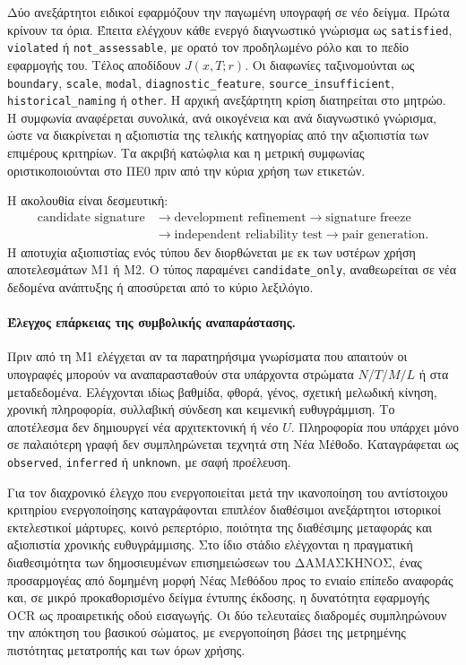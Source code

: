 \documentclass[11pt,a4paper]{article}
\begin{document}
Δύο ανεξάρτητοι ειδικοί εφαρμόζουν την παγωμένη υπογραφή σε νέο δείγμα. Πρώτα κρίνουν τα όρια. Έπειτα ελέγχουν κάθε ενεργό διαγνωστικό γνώρισμα ως \texttt{satisfied}, \texttt{violated} ή \texttt{not\_assessable}, με ορατό τον προδηλωμένο ρόλο και το πεδίο εφαρμογής του. Τέλος αποδίδουν $J(x,T;r)$. Οι διαφωνίες ταξινομούνται ως \texttt{boundary}, \texttt{scale}, \texttt{modal}, \texttt{diagnostic\_feature}, \texttt{source\_insufficient}, \texttt{historical\_naming} ή \texttt{other}. Η αρχική ανεξάρτητη κρίση διατηρείται στο μητρώο. Η συμφωνία αναφέρεται συνολικά, ανά οικογένεια και ανά διαγνωστικό γνώρισμα, ώστε να διακρίνεται η αξιοπιστία της τελικής κατηγορίας από την αξιοπιστία των επιμέρους κριτηρίων. Τα ακριβή κατώφλια και η μετρική συμφωνίας οριστικοποιούνται στο ΠΕ0 πριν από την κύρια χρήση των ετικετών.

Η ακολουθία είναι δεσμευτική:
\[
\begin{aligned}
\text{candidate signature} &\rightarrow \text{development refinement}
\rightarrow \text{signature freeze}\\
&\rightarrow \text{independent reliability test}
\rightarrow \text{pair generation}.
\end{aligned}
\]
Η αποτυχία αξιοπιστίας ενός τύπου δεν διορθώνεται με εκ των υστέρων χρήση αποτελεσμάτων M1 ή M2. Ο τύπος παραμένει \texttt{candidate\_only}, αναθεωρείται σε νέα δεδομένα ανάπτυξης ή αποσύρεται από το κύριο λεξιλόγιο.

\paragraph{Έλεγχος επάρκειας της συμβολικής αναπαράστασης.}
Πριν από τη M1 ελέγχεται αν τα παρατηρήσιμα γνωρίσματα που απαιτούν οι υπογραφές μπορούν να αναπαρασταθούν στα υπάρχοντα στρώματα $N/T/M/L$ ή στα μεταδεδομένα. Ελέγχονται ιδίως βαθμίδα, φθορά, γένος, σχετική μελωδική κίνηση, χρονική πληροφορία, συλλαβική σύνδεση και κειμενική ευθυγράμμιση. Το αποτέλεσμα δεν δημιουργεί νέα αρχιτεκτονική ή νέο $U$. Πληροφορία που υπάρχει μόνο σε παλαιότερη γραφή δεν συμπληρώνεται τεχνητά στη Νέα Μέθοδο. Καταγράφεται ως \texttt{observed}, \texttt{inferred} ή \texttt{unknown}, με σαφή προέλευση.

Για τον διαχρονικό έλεγχο που ενεργοποιείται μετά την ικανοποίηση του αντίστοιχου κριτηρίου ενεργοποίησης καταγράφονται επιπλέον διαθέσιμοι ανεξάρτητοι ιστορικοί εκτελεστικοί μάρτυρες, κοινό ρεπερτόριο, ποιότητα της διαθέσιμης μεταφοράς και αξιοπιστία χρονικής ευθυγράμμισης. Στο ίδιο στάδιο ελέγχονται η πραγματική διαθεσιμότητα των δημοσιευμένων επισημειώσεων του ΔΑΜΑΣΚΗΝΟΣ, ένας προσαρμογέας από δομημένη μορφή Νέας Μεθόδου προς το ενιαίο επίπεδο αναφοράς και, σε μικρό προκαθορισμένο δείγμα έντυπης έκδοσης, η δυνατότητα εφαρμογής OCR ως προαιρετικής οδού εισαγωγής. Οι δύο τελευταίες διαδρομές συμπληρώνουν την απόκτηση του βασικού σώματος, με ενεργοποίηση βάσει της μετρημένης πιστότητας μετατροπής και των όρων χρήσης.
\end{document}
